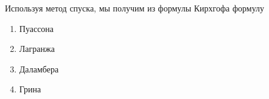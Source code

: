 Используя метод спуска, мы получим из формулы Кирхгофа формулу

\begin{enumerate}[label=\arabic*)]
    \item Пуассона
    \item Лагранжа
    \item Даламбера
    \item Грина
\end{enumerate}

